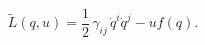 \begin{equation}
\tilde{L}(q,u)=\frac{1}{2}\,\gamma _{ij}\,\dot{q}^{i}\dot{q}^{j}-uf(q).
\label{ex-2}
\end{equation}

